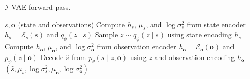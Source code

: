 \begin{algorithm}[H]
    \caption{$\mathcal{I}$-VAE forward pass.} 
    \label{alg:ivae_forward}
    \begin{algorithmic}[1]
    \Require $s, \mathbf{o}$ (state and observations)
    \State Compute $h_s$, $\mu_s$, and $\log \sigma^2_s$ from state encoder $h_s = \mathcal{E}_s(s)$ and $q_\phi(z \mid s)$
    \State Sample $z \sim q_\phi(z \mid s)$ using state encoding $h_s$
    \State Compute $h_\mathbf{o}$, $\mu_\mathbf{o}$, and $\log \sigma^2_\mathbf{o}$ from observation encoder $h_\mathbf{o} = \mathcal{E}_\mathbf{o}(\mathbf{o})$ and $p_\psi(z \mid \mathbf{o})$
    \State Decode $\hat{s}$ from $p_\theta(s \mid z, \mathbf{o})$ using $z$ and observation encoding $h_\mathbf{o}$
    \State \Return $(\hat{s}, \mu_s, \log \sigma^2_s, \mu_\mathbf{o}, \log \sigma^2_\mathbf{o})$
    \end{algorithmic}
\end{algorithm}
